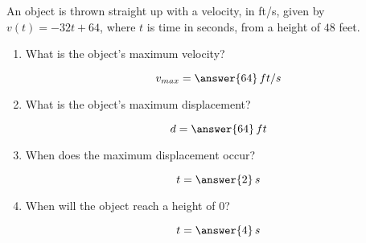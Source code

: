 \documentclass{ximera}
\author{Gregory Hartman \and Matthew Carr}
\begin{document}
\begin{exercise}

An object is thrown straight up with a velocity, in ft/s, given by
$v(t)=-32t+64$, where $t$ is time in seconds, from a height of $48$
feet.
\begin{enumerate}
\item What is the object's maximum velocity? \begin{prompt}\[v_{max}=\answer{64}\,ft/s\]\end{prompt}
\item What is the object's maximum displacement? \begin{prompt}\[d=\answer{64}\,ft\]\end{prompt}
\item When does the maximum displacement occur? \begin{prompt}\[t=\answer{2}\,s\]\end{prompt}
\item When will the object reach a height of $0$? \begin{prompt}\[t=\answer{4}\,s\]\end{prompt}
\end{enumerate}

\end{exercise}
\end{document}
